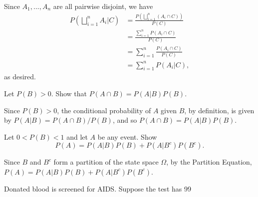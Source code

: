 \begin{solution}
  Since $A_1, ..., A_n$ are all pairwise disjoint, we have
  \begin{align*}
  P \left( \bigsqcup_{i = 1}^n A_i | C \right) &= \frac{P \left( \bigsqcup_{i = 1}^n (A_i \cap C) \right)}{P(C)} \\
  &= \frac{\sum_{i = 1}^{n} P(A_i \cap C)}{P(C)} \\
  &= \sum_{i = 1}^n \frac{P(A_i \cap C)}{P(C)} \\
  &= \sum_{i = 1}^n P(A_i | C),
  \end{align*}
  as desired.
\end{solution}


\begin{problem}
  Let $P(B) > 0$. Show that $P(A \cap B) = P(A | B)P(B)$.
\end{problem}

\begin{solution}
  Since $P(B) > 0$, the conditional probability of $A$ given $B$, by definition, is given by $P(A | B) = P(A \cap B) / P(B)$, and so $P(A \cap B) = P(A | B) P(B)$.
\end{solution}


\begin{problem}
  Let $0 < P(B) < 1$ and let $A$ be any event. Show
  \[ P(A) = P(A | B) P(B) + P(A | B^c) P(B^c). \]
\end{problem}

\begin{solution}
  Since $B$ and $B^c$ form a partition of the state space $\Omega$, by the Partition Equation, $P(A) = P(A | B) P(B) + P(A | B^c) P(B^c)$.
\end{solution}


\begin{problem}
  Donated blood is screened for AIDS. Suppose the test has 99%
\end{problem}

